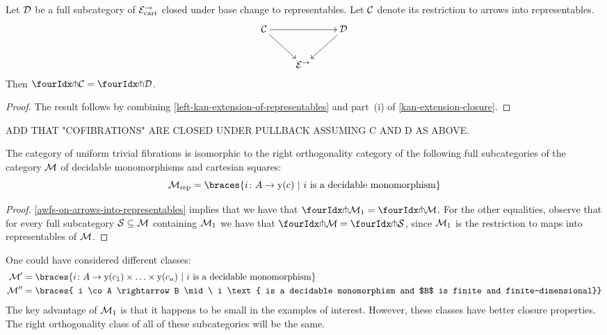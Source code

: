 \documentclass[reqno,10pt,a4paper,oneside]{amsart}
\begin{document}
\begin{lemma}
\label{awfs-on-arrows-into-representables}
Let $\cal{D}$ be a full subcategory of $\catE_{\cart}^{\to}$ closed under base change to representables.
Let $\cal{C}$ denote its restriction to arrows into representables.
\[
\xymatrix{
  \cal{C}
  \ar[rr]
  \ar[dr]
&&
  \cal{D}
  \ar[dl]
\\&
  \catE^{\to}
}
\]
Then $\liftr{\cal{C}} = \liftr{\cal{D}}$.
\end{lemma}

\begin{proof} The result follows by combining \cref{left-kan-extension-of-representables} and part~(i) of \cref{kan-extension-closure}. 
\end{proof}

ADD THAT "COFIBRATIONS" ARE CLOSED UNDER PULLBACK ASSUMING C AND D AS ABOVE.


\begin{theorem} \label{small-gen-triv-kan}
The category of uniform trivial  fibrations is isomorphic to the right orthogonality 
category of the following full subcategories of  the category $\cal{M}$ of decidable
monomorphisms and cartesian squares:
\[
\cal{M}_{\textup{rep}}  = \braces{i \co A \rightarrow \yon(c) \ | \ i \text{ is a  decidable monomorphism} } 
\]
\end{theorem}

\begin{proof}    \cref{awfs-on-arrows-into-representables} implies that we have that $\liftr{\cal{M}_1}  = \liftr{\cal{M}}$.
For the other equalities, observe that for every full subcategory $\cal{S} \subseteq \cal{M}$ containing $\cal{M}_1$ we have that $\liftr{\cal{M}} = \liftr{\cal{S}}$, since $\cal{M}_1$ is the restriction to maps into representables  of $\cal{M}$. 
\end{proof}


\begin{remark} One could have considered different classes:
\begin{align*}
\cal{M}'  & = \braces{i \co A \rightarrow \yon(c_1) \times \ldots \times \yon(c_n)
\ | \ i \text{ is a  decidable monomorphism} }  \\
\cal{M}''  & = \braces{ i \co A \rightarrow B \mid \ i \text{ is a decidable monomorphism and 
$B$ is finite and finite-dimensional}} 
\end{align*}
The key advantage of $\cal{M}_1$ is that it happens to be small in the examples of interest. However, 
these classes have better closure properties. The right orthogonality class of all of these subcategories
will be the same.
\end{remark}
\end{document}
